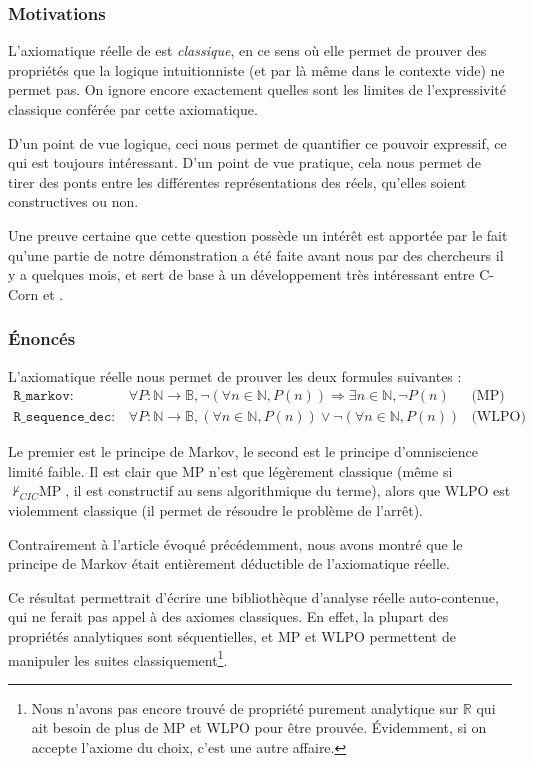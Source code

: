 \subsubsection{Motivations}

L'axiomatique réelle de \Coq{} est \emph{classique}, en ce sens où elle permet de prouver des propriétés que la logique intuitionniste (et par là même \Coq{} dans le contexte vide) ne permet pas. On ignore encore exactement quelles sont les limites de l'expressivité classique conférée par cette axiomatique.

D'un point de vue logique, ceci nous permet de quantifier ce pouvoir expressif, ce qui est toujours intéressant. D'un point de vue pratique, cela nous permet de tirer des ponts entre les différentes représen\-tations des réels, qu'elles soient constructives ou non.

Une preuve certaine que cette question possède un intérêt est apportée par le fait qu'une partie de notre démonstration a été faite avant nous par des chercheurs il y a quelques mois, et sert de base à un développement très intéressant entre C-Corn et \Coq{}.

\subsubsection{Énoncés}

L'axiomatique réelle nous permet de prouver les deux formules suivantes :
$$\begin{array}{llc}
\mathtt{R\_markov} :& \forall P : \mathbb{N}\rightarrow\mathbb{B}, \neg(\forall n\in\mathbb{N}, P(n)) \Rightarrow \exists n\in\mathbb{N}, \neg P(n) & \text{(MP)}\\
\mathtt{R\_sequence\_dec} :& \forall P : \mathbb{N}\rightarrow\mathbb{B}, (\forall n\in\mathbb{N}, P(n)) \vee \neg(\forall n\in\mathbb{N}, P(n)) & \text{(WLPO)}
\end{array}$$

Le premier est le principe de Markov, le second est le principe d'omniscience limité faible. Il est clair que MP n'est que légèrement classique (même si $\not\vdash_{CIC}\text{MP}$, il est constructif au sens algorithmique du terme), alors que WLPO est violemment classique (il permet de résoudre le problème de l'arrêt).

Contrairement à l'article évoqué précédemment, nous avons montré que le principe de Markov était entièrement déductible de l'axiomatique réelle.

Ce résultat permettrait d'écrire une bibliothèque d'analyse réelle auto-contenue, qui ne ferait pas appel à des axiomes classiques. En effet, la plupart des propriétés analytiques sont séquentielles, et MP et WLPO permettent de manipuler les suites classiquement\footnote{Nous n'avons pas encore trouvé de propriété purement analytique sur $\mathbb{R}$ qui ait besoin de plus de MP et WLPO pour être prouvée. Évidemment, si on accepte l'axiome du choix, c'est une autre affaire.}.

